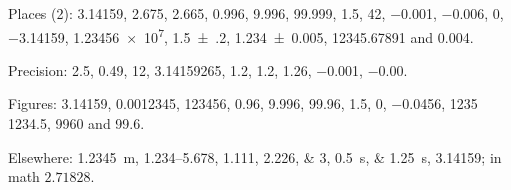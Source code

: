 \documentclass{article}
\begin{document}
Places (2): \num{3.14159}, \num{2.675}, \num{2.665}, \num{0.996}, \num{9.996}, \num{99.999}, \num{1.5},
\num{42}, \num{-0.001}, \num{-0.006}, \num{0}, \num{-3.14159}, \num{1.23456e7}, \num{1.5(2)},
\num{1.234 \pm 0.005}, \num{12345.67891} and \num{.004}.

Precision: \num[round-precision=0]{2.5}, \num[round-precision=0]{0.49}, \num[round-precision=0]{12},
\num[round-precision=4]{3.14159265}, \num[round-precision=3]{1.2}, \num[round-pad=false]{1.2},
\num[round-pad=false, round-precision=1]{1.26}, \num[round-zero-positive=false]{-0.001},
\num[round-zero-positive=false]{-0.00}.

Figures: \num[round-mode=figures]{3.14159}, \num[round-mode=figures]{0.0012345},
\num[round-mode=figures, round-precision=3]{123456}, \num[round-mode=figures, round-precision=1]{0.96},
\num[round-mode=figures, round-precision=3]{9.996}, \num[round-mode=figures, round-precision=3]{99.96},
\num[round-mode=figures, round-precision=4]{1.5}, \num[round-mode=figures, round-precision=2]{0},
\num[round-mode=figures, round-precision=2]{-0.0456}, \num[round-mode=figures, round-precision=2]{1235}
\num[round-mode=figures, round-precision=5]{1234.5}, \num[round-mode=figures, round-precision=2]{9960}
and \num[round-mode=figures, round-precision=2]{99.6}.

Elsewhere: \SI{1.2345}{\metre}, \numrange{1.234}{5.678}, \numlist{1.111;2.226;3},
\qtylist{0.5;1.25}{\second}, \num[round-mode=none]{3.14159}; in math $\num{2.71828}$.
\end{document}
